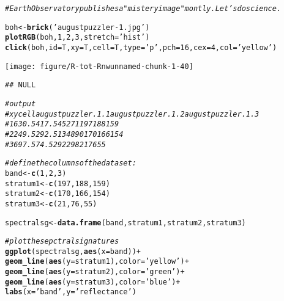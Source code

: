 \documentclass{article}\usepackage[]{graphicx}\usepackage[]{color}
\makeatletter
\newcommand{\hlnum}[1]{\textcolor[rgb]{0.686,0.059,0.569}{#1}}%
\newcommand{\hlstr}[1]{\textcolor[rgb]{0.192,0.494,0.8}{#1}}%
\newcommand{\hlcom}[1]{\textcolor[rgb]{0.678,0.584,0.686}{\textit{#1}}}%
\newcommand{\hlopt}[1]{\textcolor[rgb]{0,0,0}{#1}}%
\newcommand{\hlstd}[1]{\textcolor[rgb]{0.345,0.345,0.345}{#1}}%
\newcommand{\hlkwb}[1]{\textcolor[rgb]{0.69,0.353,0.396}{#1}}%
\newcommand{\hlkwc}[1]{\textcolor[rgb]{0.333,0.667,0.333}{#1}}%
\newcommand{\hlkwd}[1]{\textcolor[rgb]{0.737,0.353,0.396}{\textbf{#1}}}%
\newenvironment{kframe}{%
 \def\at@end@of@kframe{}%
 \ifinner\ifhmode%
  \def\at@end@of@kframe{\end{minipage}}%
  \begin{minipage}{\columnwidth}%
 \fi\fi%
 \def\FrameCommand##1{\hskip\@totalleftmargin \hskip-\fboxsep
 \colorbox{shadecolor}{##1}\hskip-\fboxsep
     \hskip-\linewidth \hskip-\@totalleftmargin \hskip\columnwidth}%
 \MakeFramed {\advance\hsize-\width
   \@totalleftmargin\z@ \linewidth\hsize
   \@setminipage}}%
 {\par\unskip\endMakeFramed%
 \at@end@of@kframe}
\newenvironment{knitrout}{}{} %
\makeatother
\begin{document}
\begin{knitrout}
\begin{kframe}
\begin{alltt}
\hlcom{# Earth Observatory publishes a "mistery image" montly. Let's do science.}

\hlstd{boh} \hlkwb{<-} \hlkwd{brick}\hlstd{(}\hlstr{'augustpuzzler-1.jpg'}\hlstd{)}
\hlkwd{plotRGB}\hlstd{(boh,} \hlnum{1}\hlstd{,} \hlnum{2}\hlstd{,} \hlnum{3}\hlstd{,} \hlkwc{stretch} \hlstd{=} \hlstr{'hist'}\hlstd{)}
\hlkwd{click}\hlstd{(boh,} \hlkwc{id} \hlstd{= T,} \hlkwc{xy} \hlstd{= T,} \hlkwc{cell} \hlstd{= T,} \hlkwc{type} \hlstd{=} \hlstr{'p'}\hlstd{,} \hlkwc{pch} \hlstd{=} \hlnum{16}\hlstd{,} \hlkwc{cex} \hlstd{=} \hlnum{4}\hlstd{,} \hlkwc{col} \hlstd{=} \hlstr{'yellow'}\hlstd{)}
\end{alltt}
\end{kframe}

{\centering \texttt{[image: figure/R-tot-Rnwunnamed-chunk-1-40]} 

}


\begin{kframe}\begin{verbatim}
## NULL
\end{verbatim}
\begin{alltt}
\hlcom{# output}
\hlcom{# x     y   cell augustpuzzler.1.1 augustpuzzler.1.2 augustpuzzler.1.3}
\hlcom{# 1 630.5 417.5  45271               197               188               159}
\hlcom{# 2 249.5 292.5 134890               170               166               154}
\hlcom{# 3 697.5  74.5 292298                21                76                55}


\hlcom{# define the columns of the dataset:}
\hlstd{band} \hlkwb{<-} \hlkwd{c}\hlstd{(}\hlnum{1}\hlstd{,} \hlnum{2}\hlstd{,} \hlnum{3}\hlstd{)}
\hlstd{stratum1} \hlkwb{<-} \hlkwd{c}\hlstd{(}\hlnum{197}\hlstd{,} \hlnum{188}\hlstd{,} \hlnum{159}\hlstd{)}
\hlstd{stratum2} \hlkwb{<-} \hlkwd{c}\hlstd{(}\hlnum{170}\hlstd{,} \hlnum{166}\hlstd{,} \hlnum{154}\hlstd{)}
\hlstd{stratum3} \hlkwb{<-} \hlkwd{c}\hlstd{(}\hlnum{21}\hlstd{,} \hlnum{76}\hlstd{,} \hlnum{55}\hlstd{)}

\hlstd{spectralsg} \hlkwb{<-} \hlkwd{data.frame}\hlstd{(band, stratum1, stratum2, stratum3)}

\hlcom{# plot the sepctral signatures}
\hlkwd{ggplot}\hlstd{(spectralsg,} \hlkwd{aes}\hlstd{(}\hlkwc{x} \hlstd{= band))} \hlopt{+}
  \hlkwd{geom_line}\hlstd{(}\hlkwd{aes}\hlstd{(}\hlkwc{y} \hlstd{= stratum1),} \hlkwc{color} \hlstd{=} \hlstr{'yellow'}\hlstd{)} \hlopt{+}
  \hlkwd{geom_line}\hlstd{(}\hlkwd{aes}\hlstd{(}\hlkwc{y} \hlstd{= stratum2),} \hlkwc{color} \hlstd{=} \hlstr{'green'}\hlstd{)} \hlopt{+}
  \hlkwd{geom_line}\hlstd{(}\hlkwd{aes}\hlstd{(}\hlkwc{y} \hlstd{= stratum3),} \hlkwc{color} \hlstd{=} \hlstr{'blue'}\hlstd{)} \hlopt{+}
  \hlkwd{labs}\hlstd{(}\hlkwc{x} \hlstd{=} \hlstr{'band'}\hlstd{,} \hlkwc{y} \hlstd{=} \hlstr{'reflectance'}\hlstd{)}
\end{alltt}
\end{kframe}


\end{knitrout}
\end{document}
